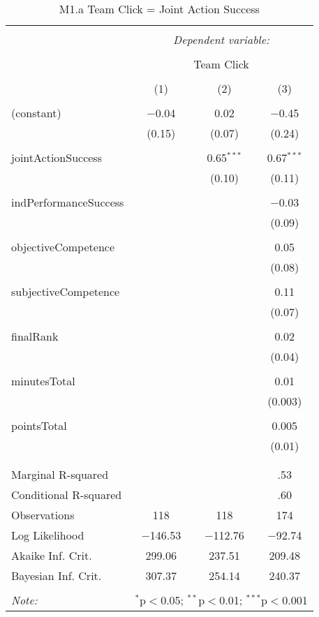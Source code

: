 
\begin{table}[!htbp] \centering 
  \caption{M1.a Team Click = Joint Action Success} 
  \label{tab:MLM1aJointActionSuccessClick} 
\footnotesize 
\begin{tabular}{@{\extracolsep{5pt}}lccc} 
\\[-1.8ex]\hline 
\hline \\[-1.8ex] 
 & \multicolumn{3}{c}{\textit{Dependent variable:}} \\ 
\cline{2-4} 
\\[-1.8ex] & \multicolumn{3}{c}{Team Click} \\ 
\\[-1.8ex] & (1) & (2) & (3)\\ 
\hline \\[-1.8ex] 
 (constant) & $-$0.04 & 0.02 & $-$0.45 \\ 
  & (0.15) & (0.07) & (0.24) \\ 
  & & & \\ 
 jointActionSuccess &  & 0.65$^{***}$ & 0.67$^{***}$ \\ 
  &  & (0.10) & (0.11) \\ 
  & & & \\ 
 indPerformanceSuccess &  &  & $-$0.03 \\ 
  &  &  & (0.09) \\ 
  & & & \\ 
 objectiveCompetence &  &  & 0.05 \\ 
  &  &  & (0.08) \\ 
  & & & \\ 
 subjectiveCompetence &  &  & 0.11 \\ 
  &  &  & (0.07) \\ 
  & & & \\ 
 finalRank &  &  & 0.02 \\ 
  &  &  & (0.04) \\ 
  & & & \\ 
 minutesTotal &  &  & 0.01 \\ 
  &  &  & (0.003) \\ 
  & & & \\ 
 pointsTotal &  &  & 0.005 \\ 
  &  &  & (0.01) \\ 
  & & & \\ 
\hline \\[-1.8ex] 
Marginal R-squared &  &  & .53 \\ 
Conditional R-squared &  &  & .60 \\ 
Observations & 118 & 118 & 174 \\ 
Log Likelihood & $-$146.53 & $-$112.76 & $-$92.74 \\ 
Akaike Inf. Crit. & 299.06 & 237.51 & 209.48 \\ 
Bayesian Inf. Crit. & 307.37 & 254.14 & 240.37 \\ 
\hline 
\hline \\[-1.8ex] 
\textit{Note:}  & \multicolumn{3}{r}{$^{*}$p$<$0.05; $^{**}$p$<$0.01; $^{***}$p$<$0.001} \\ 
\end{tabular} 
\end{table} 

